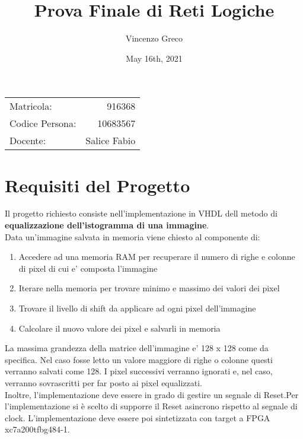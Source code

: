 \documentclass{article}
\title{Prova Finale di Reti Logiche} %
\author{Vincenzo Greco} %
\date{May 16th, 2021}
\begin{document}
\maketitle %
\begin{center}
\begin{tabular}{l r}
Matricola: & 916368\\ %
Codice Persona: & 10683567\\
Docente: & Salice Fabio  %
\end{tabular}
\end{center}

\section{Requisiti del Progetto}

Il progetto richiesto consiste nell'implementazione in VHDL dell metodo di \textbf{
equalizzazione dell’istogramma di una immagine}.\\
Data un'immagine salvata in memoria viene chiesto al componente di:
\begin{enumerate}
\item Accedere ad una memoria RAM per recuperare il numero di righe e colonne di pixel di cui e' composta l'immagine
\item Iterare nella memoria per trovare minimo e massimo dei valori dei pixel
\item Trovare il livello di shift da applicare ad ogni pixel dell'immagine
\item Calcolare il nuovo valore dei pixel e salvarli in memoria
\end{enumerate}

La massima grandezza della matrice dell'immagine e' 128 x 128 come da specifica. Nel caso fosse letto un valore maggiore di righe o colonne questi verranno salvati come 128. I pixel successivi verranno ignorati e, nel caso, verranno sovrascritti per far posto ai pixel equalizzati.\\
Inoltre, l'implementazione deve essere in grado di gestire un segnale di Reset.Per l'implementazione si è scelto di supporre il Reset asincrono rispetto al segnale di clock. L'implementazione deve essere poi sintetizzata con target a FPGA xc7a200tfbg484-1.

\newpage
\noindent

\end{document}
